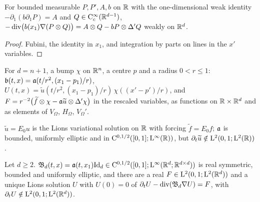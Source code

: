 \begin{lemma}
  \label{lem:tensor}
  \leanok
  For bounded measurable $P,P',A,b$ on $\mathbb{R}$ with the one-dimensional weak identity
  $-\partial_1(b\partial_1P)=A$ and $Q\in\mathrm{C}_c^\infty(\mathbb{R}^{d-1})$,
  $-\operatorname{div}\bigl(b(x_1)\nabla(P\otimes Q)\bigr)=A\otimes Q-bP\otimes\Delta'Q$ weakly on $\mathbb{R}^d$.
\end{lemma}

\begin{proof}
  \leanok
  Fubini, the identity in $x_1$, and integration by parts on lines in the $x'$ variables.
\end{proof}

\begin{definition}
  \label{def:domain-construction}
  \leanok
  For $d=n+1$, a bump $\chi$ on $\mathbb{R}^n$, a centre $p$ and a radius $0<r\leq1$:
  $\mathfrak{b}(t,x)=\mathfrak{a}(t/r^2,(x_1-p_1)/r)$, $U(t,x)=\widetilde u(t/r^2,(x_1-p_1)/r)\,\chi((x'-p')/r)$, and
  $F=r^{-2}\bigl(\widetilde f\otimes\chi-\mathfrak{a}\widetilde u\otimes\Delta'\chi\bigr)$ in the rescaled variables, as
  functions on $\mathbb{R}\times\mathbb{R}^d$ and as elements of $V_\Omega$, $H_\Omega$, $V_\Omega'$.
\end{definition}

\begin{proposition}
  \label{prop:line}
  \leanok
  $\widetilde u=E_0u$ is the Lions variational solution on $\mathbb{R}$ with forcing $\widetilde f=E_0f$; $\mathfrak{a}$ is
  bounded, uniformly elliptic and in $\mathrm{C}^{0,1/2}([0,1];\mathrm{L}^\infty(\mathbb{R}))$, but
  $\partial_t\widetilde u\notin\mathrm{L}^2(0,1;\mathrm{L}^2(\mathbb{R}))$.
\end{proposition}

\begin{proposition}
  \label{prop:tensor}
  \leanok
  Let $d\geq2$.  $\mathfrak{B}_d(t,x)=\mathfrak{a}(t,x_1)\mathrm{Id}_d\in\mathrm{C}^{0,1/2}([0,1];\mathrm{L}^\infty(\mathbb{R}^d;\mathbb{R}^{d\times d}))$ is
  real symmetric, bounded and uniformly elliptic, and there are a real
  $F\in\mathrm{L}^2(0,1;\mathrm{L}^2(\mathbb{R}^d))$ and a unique Lions solution $U$ with $U(0)=0$ of
  $\partial_tU-\operatorname{div}(\mathfrak{B}_d\nabla U)=F$, with $\partial_tU\notin\mathrm{L}^2(0,1;\mathrm{L}^2(\mathbb{R}^d))$.
\end{proposition}

